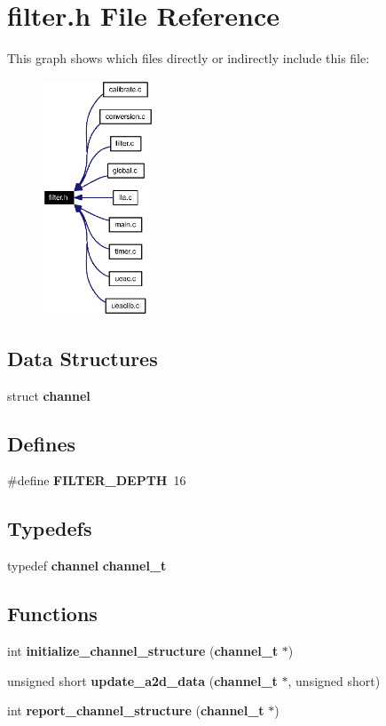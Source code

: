 \section{filter.h File Reference}
\label{filter_8h}


This graph shows which files directly or indirectly include this file:\begin{figure}[H]
\begin{center}
\leavevmode
\includegraphics[width=94pt]{filter_8h__dep__incl}
\end{center}
\end{figure}
\subsection*{Data Structures}
\begin{CompactItemize}
\item 
struct {\bf channel}
\end{CompactItemize}
\subsection*{Defines}
\begin{CompactItemize}
\item 
\#define {\bf FILTER\_\-DEPTH}~16
\end{CompactItemize}
\subsection*{Typedefs}
\begin{CompactItemize}
\item 
typedef {\bf channel} {\bf channel\_\-t}
\end{CompactItemize}
\subsection*{Functions}
\begin{CompactItemize}
\item 
int {\bf initialize\_\-channel\_\-structure} ({\bf channel\_\-t} $\ast$)
\item 
unsigned short {\bf update\_\-a2d\_\-data} ({\bf channel\_\-t} $\ast$, unsigned short)
\item 
int {\bf report\_\-channel\_\-structure} ({\bf channel\_\-t} $\ast$)
\end{CompactItemize}


